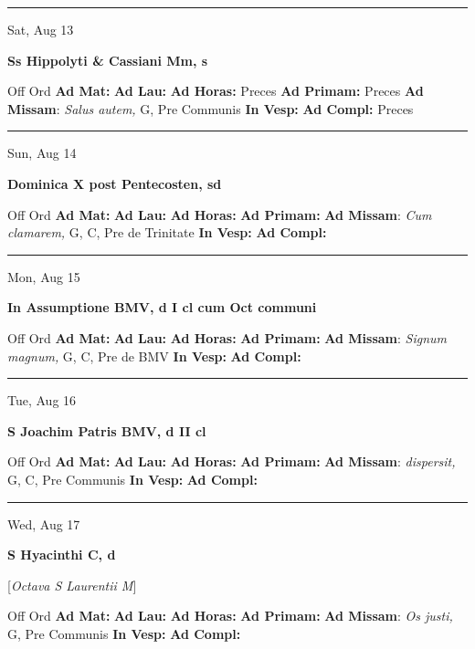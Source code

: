 \documentclass[letterpaper, 10pt]{article}
\begin{document}
\hrule
\begin{center}
Sat, Aug 13
\end{center}\textbf{ \large Ss Hippolyti \& Cassiani Mm, \textnormal{\normalsize s}}
\begin{justify}
Off Ord
\textbf{Ad Mat: }
\textbf{Ad Lau: }
\textbf{Ad Horas: }Preces
\textbf{Ad Primam: }Preces
\textbf{Ad Missam}: \textit{Salus autem,} G, Pre Communis
\textbf{In Vesp: }
\textbf{Ad Compl: }Preces\end{justify}



\hrule
\begin{center}
Sun, Aug 14
\end{center}\textbf{ \large Dominica X post Pentecosten, \textnormal{\normalsize sd}}
\begin{justify}
Off Ord
\textbf{Ad Mat: }
\textbf{Ad Lau: }
\textbf{Ad Horas: }
\textbf{Ad Primam: }
\textbf{Ad Missam}: \textit{Cum clamarem,} G, C, Pre de Trinitate
\textbf{In Vesp: }
\textbf{Ad Compl: }\end{justify}



\hrule
\begin{center}
Mon, Aug 15
\end{center}\textbf{ \large In Assumptione BMV, \textnormal{\normalsize d I cl cum Oct communi}}
\begin{justify}
Off Ord
\textbf{Ad Mat: }
\textbf{Ad Lau: }
\textbf{Ad Horas: }
\textbf{Ad Primam: }
\textbf{Ad Missam}: \textit{Signum magnum,} G, C, Pre de BMV
\textbf{In Vesp: }
\textbf{Ad Compl: }\end{justify}



\hrule
\begin{center}
Tue, Aug 16
\end{center}\textbf{ \large S Joachim Patris BMV, \textnormal{\normalsize d II cl}}
\begin{justify}
Off Ord
\textbf{Ad Mat: }
\textbf{Ad Lau: }
\textbf{Ad Horas: }
\textbf{Ad Primam: }
\textbf{Ad Missam}: \textit{dispersit,} G, C, Pre Communis
\textbf{In Vesp: }
\textbf{Ad Compl: }\end{justify}



\hrule
\begin{center}
Wed, Aug 17
\end{center}\textbf{ \large S Hyacinthi C, \textnormal{\normalsize d}}

[\textit{Octava S Laurentii M}]
\begin{justify}
Off Ord
\textbf{Ad Mat: }
\textbf{Ad Lau: }
\textbf{Ad Horas: }
\textbf{Ad Primam: }
\textbf{Ad Missam}: \textit{Os justi,} G, Pre Communis
\textbf{In Vesp: }
\textbf{Ad Compl: }\end{justify}
\end{document}
